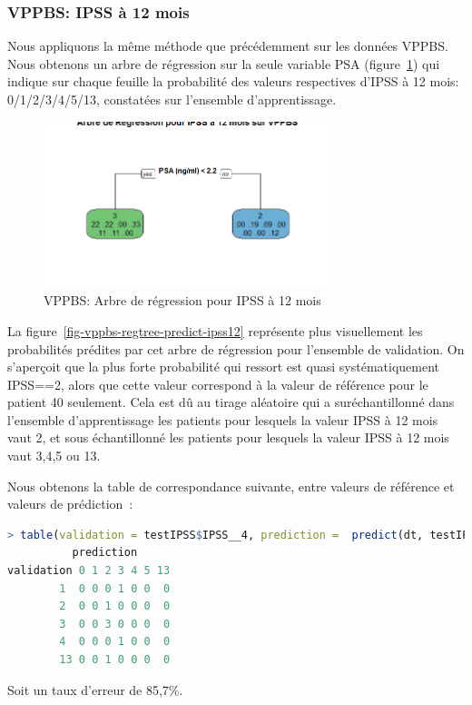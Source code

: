 %
%

%

\subsubsection{VPPBS: IPSS à 12 mois}

Nous appliquons la même méthode que précédemment sur les données VPPBS.
Nous obtenons un arbre de régression sur la seule variable PSA (figure~\ref{fig-vppbs-regtree-ipss12}) qui indique sur chaque feuille la probabilité des valeurs respectives d'IPSS à 12 mois: 0/1/2/3/4/5/13, constatées sur l'ensemble d'apprentissage.

\begin{figure}[H]
\centering
\includegraphics[width=0.75\textwidth]{../Fig/VPPBS/vppbs-regtree-ipss12.png}
\caption{VPPBS: Arbre de régression pour IPSS à 12 mois}
\label{fig-vppbs-regtree-ipss12}
\end{figure}

La figure~\ref{fig-vppbs-regtree-predict-ipss12} représente plus visuellement les probabilités prédites par cet arbre de régression pour l'ensemble de validation. On s'aperçoit que la plus forte probabilité qui ressort est quasi systématiquement
IPSS==2, alors que cette valeur correspond à la valeur de référence pour le patient 40 seulement. Cela est dû au tirage aléatoire qui a suréchantillonné dans l'ensemble d'apprentissage les patients pour lesquels la valeur IPSS à 12 mois vaut 2, et sous échantillonné les patients pour lesquels la valeur IPSS à 12 mois vaut 3,4,5 ou 13.

Nous obtenons la table de correspondance suivante, entre valeurs de référence et valeurs de prédiction~:

\begin{lstlisting}[language=R]
> table(validation = testIPSS$IPSS__4, prediction =  predict(dt, testIPSS, type="class"))
          prediction
validation 0 1 2 3 4 5 13
        1  0 0 0 1 0 0  0
        2  0 0 1 0 0 0  0
        3  0 0 3 0 0 0  0
        4  0 0 0 1 0 0  0
        13 0 0 1 0 0 0  0
\end{lstlisting}
Soit un taux d'erreur de 85,7\%.

